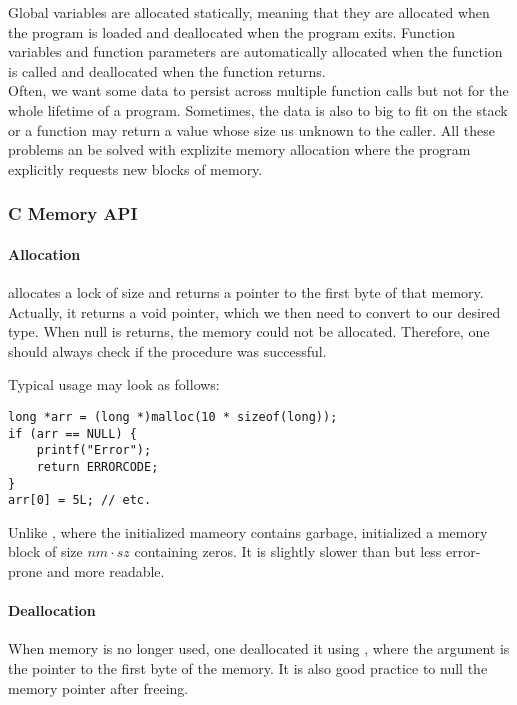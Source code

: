 

Global variables are allocated statically, meaning that they are allocated when the program is loaded and deallocated when the program exits. Function variables and function parameters are automatically allocated when the function is called and deallocated when the function returns.\\
Often, we want some data to persist across multiple function calls but not for the whole lifetime of a program. Sometimes, the data is also to big to fit on the stack or a function may return a value whose size us unknown to the caller. All these problems an be solved with explizite memory allocation where the program explicitly requests new blocks of memory.

\subsubsection{C Memory API}
\paragraph{Allocation}
 allocates a lock of size  and returns a pointer to the first byte of that memory. Actually, it returns a void pointer, which we then need to convert to our desired type. When null is returns, the memory could not be allocated. Therefore, one should always check if the procedure was successful. 

Typical usage may look as follows:
\begin{lstlisting}
long *arr = (long *)malloc(10 * sizeof(long));
if (arr == NULL) {
    printf("Error");
    return ERRORCODE;
}
arr[0] = 5L; // etc.
\end{lstlisting}

Unlike , where the initialized mameory contains garbage,  initialized a memory block of size $nm \cdot sz$ containing zeros. It is slightly slower than  but less error-prone and more readable.

\paragraph{Deallocation}
When memory is no longer used, one deallocated it using , where the argument is the pointer to the first byte of the memory. It is also good practice to null the memory pointer after freeing.


